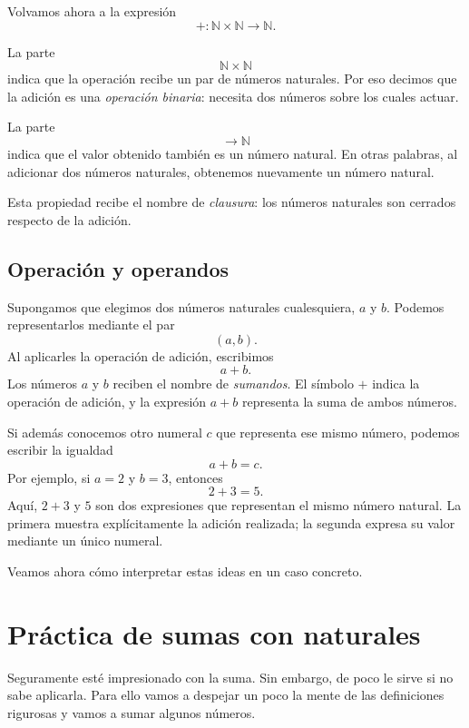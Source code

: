 Volvamos ahora a la expresión
\[
+\colon\mathbb{N}\times\mathbb{N}\to\mathbb{N}.
\]

La parte
\[
\mathbb{N}\times\mathbb{N}
\]
indica que la operación recibe un par de números naturales. Por eso decimos que la adición es una \emph{operación binaria}: necesita dos números sobre los cuales actuar.

La parte
\[
\to\mathbb{N}
\]
indica que el valor obtenido también es un número natural. En otras palabras, al adicionar dos números naturales, obtenemos nuevamente un número natural.

Esta propiedad recibe el nombre de \emph{clausura}: los números naturales son cerrados respecto de la adición.

\subsection{Operación y operandos}

Supongamos que elegimos dos números naturales cualesquiera, \(a\) y \(b\). Podemos representarlos mediante el par
\[
(a,b).
\]
Al aplicarles la operación de adición, escribimos
\[
a+b.
\]
Los números \(a\) y \(b\) reciben el nombre de \emph{sumandos}. El símbolo \(+\) indica la operación de adición, y la expresión \(a+b\) representa la suma de ambos números.

Si además conocemos otro numeral \(c\) que representa ese mismo número, podemos escribir la igualdad
\[
a+b=c.
\]
Por ejemplo, si \(a=2\) y \(b=3\), entonces
\[
2+3=5.
\]
Aquí, \(2+3\) y \(5\) son dos expresiones que representan el mismo número natural. La primera muestra explícitamente la adición realizada; la segunda expresa su valor mediante un único numeral.

Veamos ahora cómo interpretar estas ideas en un caso concreto.

\section{Práctica de sumas con naturales}

Seguramente esté impresionado con la suma. Sin embargo, de poco le sirve si no sabe aplicarla. Para ello vamos a despejar un poco la mente de las definiciones rigurosas y vamos a sumar algunos números.

